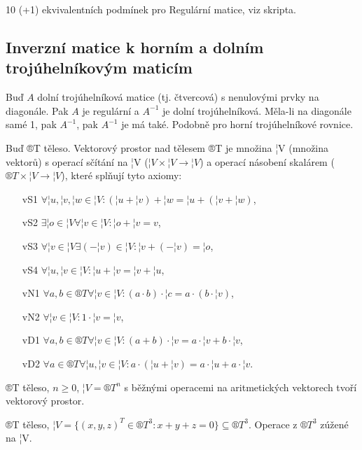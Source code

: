 \documentclass[12pt]{article}					%
\begin{document}
        \begin{veta}[V4.81 (+ T4.88)]
            10 (+1) ekvivalentních podmínek pro Regulární matice, viz skripta.
        \end{veta}

    \subsection{Inverzní matice k horním a dolním trojúhelníkovým maticím}
        \begin{tvrzeni}[T4.98]
            Buď $A$ dolní trojúhelníková matice (tj. čtvercová) s nenulovými prvky na diagonále. Pak $A$ je regulární a $A^{-1}$ je dolní trojúhelníková. Měla-li na diagonále samé 1, pak $A^{-1}$, pak $A^{-1}$ je má také. Podobně pro horní trojúhelníkové rovnice.
        \end{tvrzeni}


        \begin{definice}
            Buď ®T těleso. Vektorový prostor nad tělesem ®T je množina ¦V (množina vektorů) s operací sčítání na ¦V ($¦V\times ¦V \rightarrow ¦V$) a operací násobení skalárem ($®T\times ¦V \rightarrow ¦V$), které splňují tyto axiomy:
            \begin{itemize}
                \item[vS1] $\forall ¦u, ¦v, ¦w \in ¦V: (¦u + ¦v) + ¦w = ¦u + (¦v + ¦w)$,
                \item[vS2] $\exists ¦o \in ¦V \forall ¦v \in ¦V: ¦o + ¦v = v$,
                \item[vS3] $\forall ¦v \in ¦V \exists (-¦v) \in ¦V: ¦v+(-¦v) = ¦o$,
                \item[vS4] $\forall ¦u, ¦v \in ¦V: ¦u + ¦v = ¦v + ¦u$,
                \item[vN1] $\forall a, b \in ®T \forall ¦v \in ¦V: (a·b)·¦c = a·(b·¦v)$,
                \item[vN2] $\forall ¦v \in ¦V: 1·¦v = ¦v$,
                \item[vD1] $\forall a, b \in ®T \forall ¦v \in ¦V: (a+b)·¦v = a·¦v + b·¦v$,
                \item[vD2] $\forall a \in ®T \forall ¦u, ¦v \in ¦V: a·(¦u + ¦v) = a·¦u + a·¦v$.
            \end{itemize}
        \end{definice}

        \begin{priklady}
            ®T těleso, $n≥0$, $¦V = ®T^n$ s běžnými operacemi na aritmetických vektorech tvoří vektorový prostor.

            ®T těleso, $¦V = \{(x, y, z)^T \in ®T^3: x+y+z = 0\} \subseteq ®T^3$. Operace z $®T^3$ zúžené na ¦V.
        \end{priklady}
\end{document}
